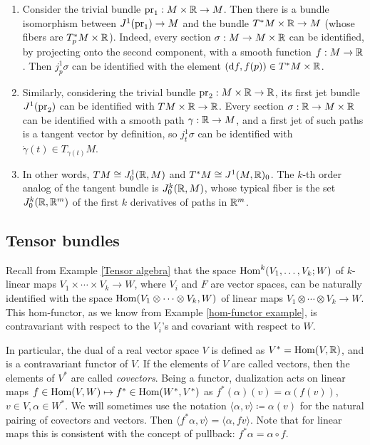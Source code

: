 \begin{example}
    \begin{enumerate}
        \item Consider the trivial bundle $\operatorname{pr}_1:M\times\mathbb{R}\to M$. Then there is a bundle isomorphism between $J^1(\operatorname{pr}_1)\to M$ and the bundle $T^\ast M\times \mathbb{R}\to M$ (whose fibers are $T^\ast_pM\times\mathbb{R}$). Indeed, every section $\sigma:M\to M\times\mathbb{R}$ can be identified, by projecting onto the second component, with a smooth function $f:M\to \mathbb{R}$. Then $j^1_p\sigma$ can be identified with the element $({\mathrm{d}} f,f(p))\in T^\ast M\times \mathbb{R}$.
        
        \item Similarly, considering the trivial bundle $\operatorname{pr}_2:M\times \mathbb{R}\to \mathbb{R}$, its first jet bundle $J^1(\operatorname{pr}_2)$ can be identified with $TM\times \mathbb{R}\to \mathbb{R}$. Every section $\sigma:\mathbb{R}\to M\times\mathbb{R}$ can be identified with a smooth path $\gamma:\mathbb{R}\to M$, and a first jet of such paths is a tangent vector by definition, so $j^1_t\sigma$ can be identified with $\dot\gamma(t)\in T_{\gamma(t)}M$.

        \item In other words, $TM\cong J^1_0(\mathbb{R},M)$ and $T^\ast M\cong J^1(M,\mathbb{R})_0$. The $k$-th order analog of the tangent bundle is $J^k_0(\mathbb{R},M)$, whose typical fiber is the set $J_0^k(\mathbb{R},\mathbb{R}^m)$ of the first $k$ derivatives of paths in $\mathbb{R}^m$.
    \end{enumerate}
\end{example}





\subsection{Tensor bundles}

Recall from Example \ref{Tensor algebra} that the space $\operatorname{Hom}^k(V_1,\ldots,V_k;W)$ of $k$-linear maps $V_1\times \cdots\times V_k\to W$, where $V_i$ and $F$ are vector spaces, can be naturally identified with the space $\operatorname{Hom}(V_1\otimes\cdots\otimes V_k,W)$ of linear maps $V_1\otimes \cdots\otimes V_k\to W$. This hom-functor, as we know from Example \ref{hom-functor example}, is contravariant with respect to the $V_i$'s and covariant with respect to $W$. 

In particular, the dual of a real vector space $V$ is defined as $V^\ast=\operatorname{Hom}(V,\mathbb{R} )$, and is a contravariant functor of $V$. If the elements of $V$ are called vectors, then the elements of $V^\ast$ are called \emph{covectors}. Being a functor, dualization acts on linear maps $f\in\operatorname{Hom}(V,W)\mapsto f^\ast\in \operatorname{Hom}(W^\ast,V^\ast)$ as $f^\ast(\alpha)(v)=\alpha(f(v))$, $v\in V, \alpha\in W^\ast$. We will sometimes use the notation $\langle \alpha,v\rangle\coloneqq\alpha(v)$ for the natural pairing of covectors and vectors. Then  $\langle f^\ast \alpha,v\rangle=\langle \alpha,fv\rangle$. Note that for linear maps this is consistent with the concept of pullback: $f^\ast\alpha=\alpha\circ f$.

